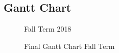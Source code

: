 \documentclass[onecolumn, draftclsnofoot,10pt, compsoc]{IEEEtran}
\begin{document}
\subsection{Gantt Chart}
\begin{figure}[htp] 
\caption{Fall Term 2018}
\end{figure}

\begin{figure}[htp] 
\caption{Final Gantt Chart Fall Term}
\end{figure}
\end{document}
